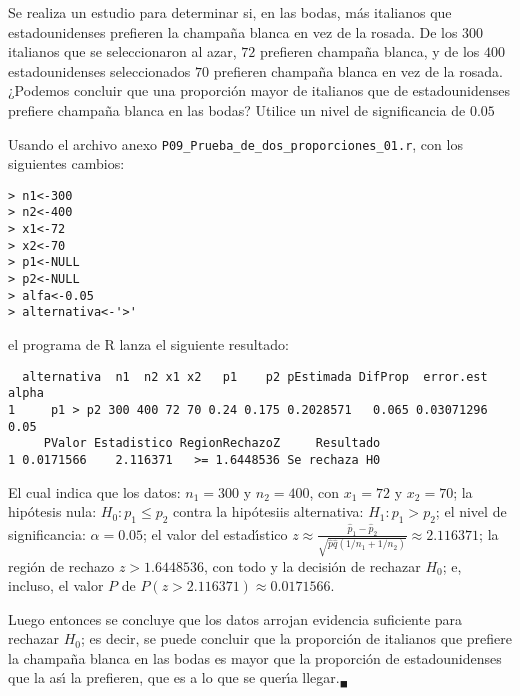 \begin{enunciado}
 Se realiza un estudio para determinar
 si, en las bodas, m\'as italianos que estadounidenses prefieren
 la champa\~na blanca en vez de la rosada.
 De los $300$ italianos que se seleccionaron al azar, $72$ prefieren
 champa\~na blanca, y de los $400$ estadounidenses seleccionados
 $70$ prefieren champa\~na blanca en vez de la rosada.
 ¿Podemos concluir que una proporci\'on mayor
 de italianos que de estadounidenses prefiere champa\~na blanca
 en las bodas?
 Utilice un nivel de significancia de $0.05$
\end{enunciado}

\begin{solucion}
 Usando el archivo anexo \texttt{P09\_Prueba\_de\_dos\_proporciones\_01.r}, con los siguientes cambios:
 \begin{verbatim}
> n1<-300
> n2<-400
> x1<-72
> x2<-70
> p1<-NULL
> p2<-NULL
> alfa<-0.05
> alternativa<-'>'
 \end{verbatim}
 \vspace{-0.5cm}
 el programa de R lanza el siguiente resultado:
 \begin{verbatim}
  alternativa  n1  n2 x1 x2   p1    p2 pEstimada DifProp  error.est alpha
1     p1 > p2 300 400 72 70 0.24 0.175 0.2028571   0.065 0.03071296  0.05
     PValor Estadistico RegionRechazoZ     Resultado
1 0.0171566    2.116371   >= 1.6448536 Se rechaza H0
 \end{verbatim}
 \vspace{-0.5cm}
 El cual indica que los datos: $n_1 = 300$ y $n_2 = 400$,
 con $x_1 = 72$ y $x_2 = 70$; la hip\'otesis nula: $H_0: p_1 \leq p_2$
 contra la hip\'otesiis alternativa: $H_1: p_1 > p_2$; el nivel
 de significancia: $\alpha = 0.05$; el valor del estad\'{\i}stico $z \approx
 \frac{\hat{p}_1 - \hat{p}_2}{\sqrt{\hat{p}\hat{q}(1/n_1+1/n_2)}} \approx
 2.116371$; la regi\'on de rechazo $z > 1.6448536$,
 con todo y la decisi\'on de rechazar $H_0$;
 e, incluso, el valor $P$ de $P(z > 2.116371) \approx 0.0171566$.
 \par 
 Luego entonces se concluye que los datos arrojan evidencia suficiente
 para rechazar $H_0$; es decir, se puede concluir que la proporci\'on
 de italianos que prefiere la champa\~na blanca en las bodas
 es mayor que la proporci\'on de estadounidenses
 que la as\'{\i} la prefieren,
 que es a lo que se quer\'{\i}a llegar.${}_{\blacksquare}$
\end{solucion}
